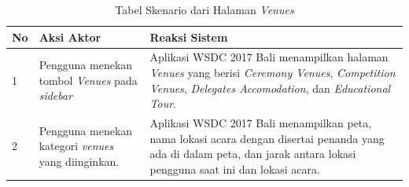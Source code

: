 \begin{enumerate}
		 \begin{table}[H]
			\centering
			\begin{tabular}{|p{0.5cm}|p{7cm}|p{7cm}|}
				\hline
				No & Aksi Aktor                               & Reaksi Sistem                                          \\ \hline
				1  & Pengguna menekan tombol \textit{Venues} pada \textit{sidebar} & Aplikasi WSDC 2017 Bali menampilkan halaman \textit{Venues} yang berisi {\it Ceremony Venues}, {\it Competition Venues}, {\it Delegates Accomodation}, dan {\it Educational Tour}.\\ \hline
				2  & Pengguna menekan kategori {\it venues} yang diinginkan. & Aplikasi WSDC 2017 Bali menampilkan peta, nama lokasi acara dengan disertai penanda yang ada di dalam peta, dan jarak antara lokasi pengguna saat ini dan lokasi acara.\\ \hline
			\end{tabular}
			\caption{Tabel Skenario dari Halaman {\it Venues}}
			\label{table:skenarioHalamanVenues}
		\end{table}


\end{enumerate}
